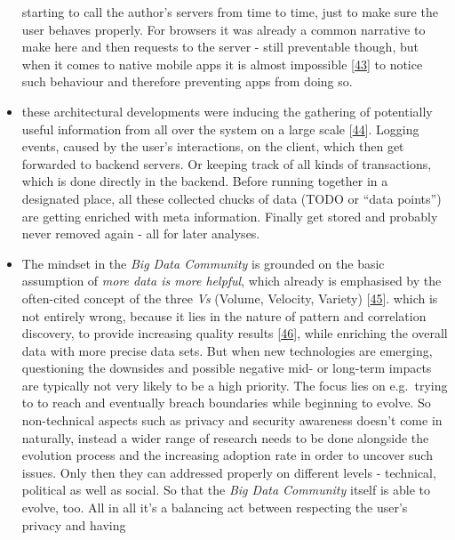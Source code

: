 \documentclass[12pt,english,a4paper,titlepage,cleardoublepage=empty,dottedtoc]{report}
\begin{document}
\begin{itemize}
  starting to call the author's servers from time to time, just to make
  sure the user behaves properly. For browsers it was already a common
  narrative to make here and then requests to the server - still
  preventable though, but when it comes to native mobile apps it is
  almost impossible
  {[}\protect\hyperlink{ref-web_2016_answers-io}{43}{]} to notice such
  behaviour and therefore preventing apps from doing so.
\item
  these architectural developments were inducing the gathering of
  potentially useful information from all over the system on a large
  scale
  {[}\protect\hyperlink{ref-web_2016_big-data-enthusiasts-should-not-ignore}{44}{]}.
  Logging events, caused by the user's interactions, on the client,
  which then get forwarded to backend servers. Or keeping track of all
  kinds of transactions, which is done directly in the backend. Before
  running together in a designated place, all these collected chucks of
  data (TODO or ``data points'') are getting enriched with meta
  information. Finally get stored and probably never removed again - all
  for later analyses.
\item
  The mindset in the \emph{Big Data Community} is grounded on the basic
  assumption of \emph{more data is more helpful}, which already is
  emphasised by the often-cited concept of the three \emph{Vs} (Volume,
  Velocity, Variety)
  {[}\protect\hyperlink{ref-report_2001_3d-data-management-controlling-data-volume-velocity-and-variety}{45}{]}.
  which is not entirely wrong, because it lies in the nature of pattern
  and correlation discovery, to provide increasing quality results
  {[}\protect\hyperlink{ref-paper_2015_big-data-for-development-a-review-of-promises-and-challenges:more-data}{46}{]},
  while enriching the overall data with more precise data sets. But when
  new technologies are emerging, questioning the downsides and possible
  negative mid- or long-term impacts are typically not very likely to be
  a high priority. The focus lies on e.g.~trying to to reach and
  eventually breach boundaries while beginning to evolve. So
  non-technical aspects such as privacy and security awareness doesn't
  come in naturally, instead a wider range of research needs to be done
  alongside the evolution process and the increasing adoption rate in
  order to uncover such issues. Only then they can addressed properly on
  different levels - technical, political as well as social. So that the
  \emph{Big Data Community} itself is able to evolve, too. All in all
  it's a balancing act between respecting the user's privacy and having

\end{itemize}
\end{document}
